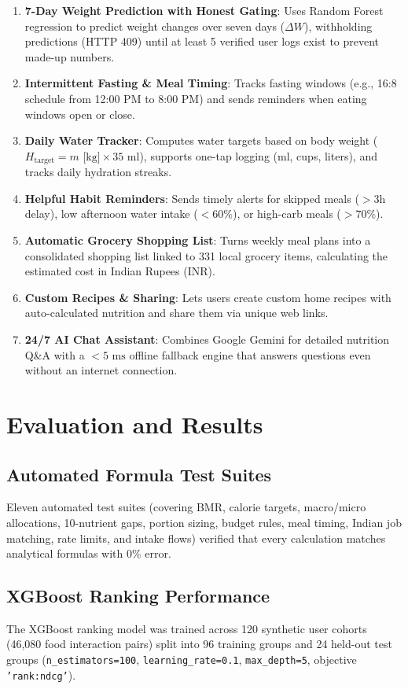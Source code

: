 \documentclass[10pt, conference, letterpaper]{IEEEtran}
\begin{document}
\begin{enumerate}[leftmargin=*, label=\bfseries\arabic*., itemsep=3.5pt, parsep=0pt]
    \item \textbf{7-Day Weight Prediction with Honest Gating}: Uses Random Forest regression to predict weight changes over seven days ($\Delta W$), withholding predictions (HTTP 409) until at least 5 verified user logs exist to prevent made-up numbers.
    \item \textbf{Intermittent Fasting \& Meal Timing}: Tracks fasting windows (e.g., 16:8 schedule from 12:00 PM to 8:00 PM) and sends reminders when eating windows open or close.
    \item \textbf{Daily Water Tracker}: Computes water targets based on body weight ($H_{\text{target}} = m\text{ [kg]} \times 35\text{ ml}$), supports one-tap logging (ml, cups, liters), and tracks daily hydration streaks.
    \item \textbf{Helpful Habit Reminders}: Sends timely alerts for skipped meals ($>3\text{h}$ delay), low afternoon water intake ($<60\%$), or high-carb meals ($>70\%$).
    \item \textbf{Automatic Grocery Shopping List}: Turns weekly meal plans into a consolidated shopping list linked to 331 local grocery items, calculating the estimated cost in Indian Rupees (INR).
    \item \textbf{Custom Recipes \& Sharing}: Lets users create custom home recipes with auto-calculated nutrition and share them via unique web links.
    \item \textbf{24/7 AI Chat Assistant}: Combines Google Gemini for detailed nutrition Q\&A with a $<5\text{ ms}$ offline fallback engine that answers questions even without an internet connection.
\end{enumerate}

\section{Evaluation and Results}

\subsection{Automated Formula Test Suites}
Eleven automated test suites (covering BMR, calorie targets, macro/micro allocations, 10-nutrient gaps, portion sizing, budget rules, meal timing, Indian job matching, rate limits, and intake flows) verified that every calculation matches analytical formulas with 0\% error.

\subsection{XGBoost Ranking Performance}
The XGBoost ranking model was trained across 120 synthetic user cohorts (46,080 food interaction pairs) split into 96 training groups and 24 held-out test groups (\texttt{n\_estimators=100}, \texttt{learning\_rate=0.1}, \texttt{max\_depth=5}, objective \texttt{'rank:ndcg'}).
\end{document}
